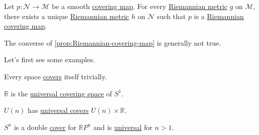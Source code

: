 \begin{proposition}\label{prop:Riemannian-covering-map}
	Let \(p\colon \mathcal{N} \to \mathcal{M} \) be a smooth \hyperref[def:covering-map]{covering map}. For every \hyperref[def:Riemannian-metric]{Riemannian metric} \(g\) on \(\mathcal{M} \), there exists a unique \hyperref[def:Riemannian-metric]{Riemannian metric} \(h\) on \(\mathcal{N} \) such that \(p\) is a \hyperref[def:Riemannian-covering-map]{Riemannian covering map}.
\end{proposition}

\begin{note}
	The converse of \autoref{prop:Riemannian-covering-map} is generally not true.
\end{note}

Let's first see some examples.

\begin{eg}
	Every space \hyperref[def:covering-map]{covers} itself trivially.
\end{eg}

\begin{eg}
	\(\mathbb{R} \) is the \hyperref[not:universal-covering-space]{universal covering space} of \(S^1\).
\end{eg}

\begin{eg}
	\(U(n)\) has \hyperref[not:universal-covering-space]{universal covers} \(U(n) \times \mathbb{R} \).
\end{eg}

\begin{eg}
	\(S^n\) is a double \hyperref[not:covering-space]{cover} for \(\mathbb{R} P^n\) and is \hyperref[not:universal-covering-space]{universal} for \(n > 1\).
\end{eg}